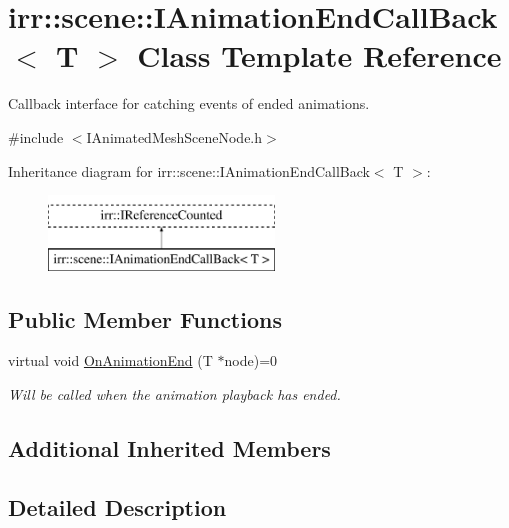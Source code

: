 \hypertarget{classirr_1_1scene_1_1IAnimationEndCallBack}{}\section{irr\+:\+:scene\+:\+:I\+Animation\+End\+Call\+Back$<$ T $>$ Class Template Reference}
\label{classirr_1_1scene_1_1IAnimationEndCallBack}


Callback interface for catching events of ended animations.  




{\ttfamily \#include $<$I\+Animated\+Mesh\+Scene\+Node.\+h$>$}

Inheritance diagram for irr\+:\+:scene\+:\+:I\+Animation\+End\+Call\+Back$<$ T $>$\+:\begin{figure}[H]
\begin{center}
\leavevmode
\includegraphics[height=2.000000cm]{classirr_1_1scene_1_1IAnimationEndCallBack}
\end{center}
\end{figure}
\subsection*{Public Member Functions}
\begin{DoxyCompactItemize}
\item 
virtual void \hyperlink{classirr_1_1scene_1_1IAnimationEndCallBack_afe7fa9ae8a2f89cc13460d915fafaead}{On\+Animation\+End} (T $\ast$node)=0
\begin{DoxyCompactList}\small\item\em Will be called when the animation playback has ended. \end{DoxyCompactList}\end{DoxyCompactItemize}
\subsection*{Additional Inherited Members}


\subsection{Detailed Description}
